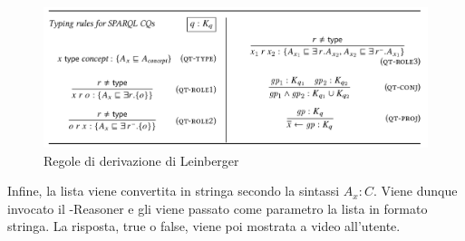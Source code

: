         \begin{figure}
            \centering
            \includegraphics[width=\textwidth]{pictures/leinbergAxiom.png}
            \caption{Regole di derivazione di Leinberger}
            \label{fig:LeinbergerAxiom}
        \end{figure}

        

        
        Infine, la lista viene convertita in stringa secondo la sintassi \(A_{x} : C\). Viene dunque invocato il -Reasoner e gli viene passato come parametro la lista in formato stringa. La risposta, true o false, viene poi mostrata a video all'utente. 
        